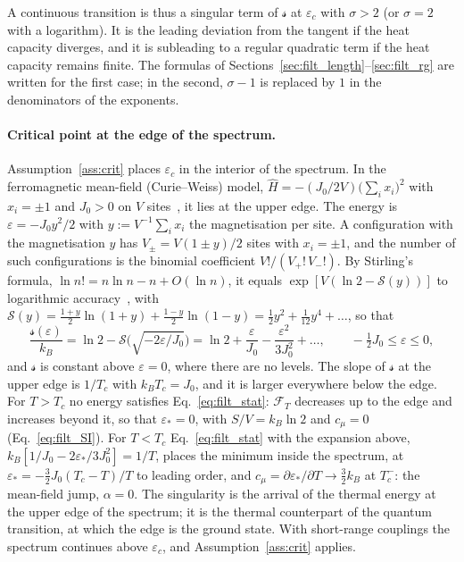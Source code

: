 \documentclass[10pt,a4paper]{article}
\theoremstyle{plain}
\newcommand{\Fen}[1][T]{\mathscr{F}_{#1}}  %
\newcommand{\lds}{\mathscr{s}}  %
\begin{document}
A continuous transition is thus a singular term of $\lds$ at $\varepsilon_c$
with $\sigma>2$ (or $\sigma=2$ with a logarithm). It is the leading deviation
from the tangent if the heat capacity diverges, and it is subleading to a
regular quadratic term if the heat capacity remains finite. The formulas of
Sections~\ref{sec:filt_length}--\ref{sec:filt_rg} are written for the
first case; in the second, $\sigma-1$ is replaced by $1$ in the denominators
of the exponents.

\paragraph{Critical point at the edge of the spectrum.}
Assumption~\ref{ass:crit} places $\varepsilon_c$ in the interior of the
spectrum. In the ferromagnetic mean-field (Curie--Weiss) model,
$\hat H=-(J_0/2V)\big(\sum_ix_i\big)^{2}$ with $x_i=\pm1$ and $J_0 > 0$ on $V$
sites~\cite[Sec.~4.5.1]{Honerkamp}, it lies at the upper edge. The energy is
$\varepsilon=-J_0y^{2}/2$ with $y:=V^{-1}\sum_ix_i$ the magnetisation per
site. A configuration with the magnetisation $y$ has $V_\pm=V(1\pm y)/2$
sites with $x_i=\pm1$, and the number of such configurations is the binomial
coefficient $V!/(V_+!\,V_-!)$. By Stirling's formula,
$\ln n!=n\ln n-n+O(\ln n)$, it equals $\exp[V(\ln2-\mathcal S(y))]$ to
logarithmic accuracy~\cite[Sec.~3.2]{Plischke}, with
$\mathcal S(y)=\tfrac{1+y}{2}\ln(1+y)+\tfrac{1-y}{2}\ln(1-y)=\tfrac12y^{2}+\tfrac1{12}y^{4}+\dots$,
so that
\[
  \frac{\lds(\varepsilon)}{k_B}=\ln2-\mathcal S\Big(\sqrt{-2\varepsilon/J_0}\Big)
  =\ln2+\frac{\varepsilon}{J_0}-\frac{\varepsilon^{2}}{3J_0^{2}}+\dots ,
  \qquad -\tfrac12J_0\le\varepsilon\le0 ,
\]
and $\lds$ is constant above $\varepsilon=0$, where there are no levels. The
slope of $\lds$ at the upper edge is $1/T_c$ with $k_BT_c=J_0$, and it is
larger everywhere below the edge. For $T>T_c$ no energy satisfies
Eq.~\eqref{eq:filt_stat}: $\Fen$ decreases up to the edge and increases
beyond it, so that $\varepsilon_*=0$, with $S/V=k_B\ln2$ and $c_\mu=0$
(Eq.~\eqref{eq:filt_SI}). For $T<T_c$ Eq.~\eqref{eq:filt_stat} with the
expansion above, $k_B[1/J_0-2\varepsilon_*/3J_0^{2}]=1/T$, places the minimum
inside the spectrum, at $\varepsilon_*=-\tfrac32J_0(T_c-T)/T$ to leading
order, and $c_\mu=\partial\varepsilon_*/\partial T\to\tfrac32k_B$ at
$T_c^{-}$: the mean-field jump, $\alpha=0$. The
singularity is the arrival of the thermal energy at the upper edge of the
spectrum; it is the thermal counterpart of the quantum transition, at which
the edge is the ground state. With short-range couplings the spectrum
continues above $\varepsilon_c$, and Assumption~\ref{ass:crit} applies.
\end{document}
